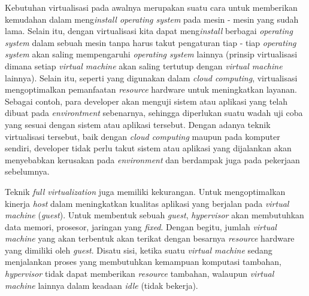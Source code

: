 Kebutuhan virtualisasi pada awalnya merupakan suatu cara untuk memberikan kemudahan dalam meng\textit{install operating system} pada mesin - mesin yang sudah lama. Selain itu, dengan virtualisasi kita dapat meng\textit{install} berbagai \textit{operating system} dalam sebuah mesin tanpa harus takut pengaturan tiap - tiap \textit{operating system} akan saling mempengaruhi \textit{operating system} lainnya (prinsip virtualisasi dimana setiap \textit{virtual machine} akan saling tertutup dengan \textit{virtual machine} lainnya). Selain itu, seperti yang digunakan dalam \textit{cloud computing}, virtualisasi mengoptimalkan pemanfaatan \textit{resource} hardware untuk meningkatkan layanan. Sebagai contoh, para developer akan menguji sistem atau aplikasi yang telah dibuat pada \textit{environtment} sebenarnya, sehingga diperlukan suatu wadah uji coba yang sesuai dengan sistem atau aplikasi tersebut. Dengan adanya teknik virtualisasi tersebut, baik dengan \textit{cloud computing} maupun pada komputer sendiri, developer tidak perlu takut sistem atau aplikasi yang dijalankan akan menyebabkan kerusakan pada \textit{environment} dan berdampak juga pada pekerjaan sebelumnya.

Teknik \textit{full virtualization} juga memiliki kekurangan. Untuk mengoptimalkan kinerja \textit{host} dalam meningkatkan kualitas aplikasi yang berjalan pada \textit{virtual machine} (\textit{guest}). Untuk membentuk sebuah \textit{guest}, \textit{hypervisor} akan membutuhkan data memori, prosesor, jaringan yang \textit{fixed}. Dengan begitu, jumlah \textit{virtual machine} yang akan terbentuk akan terikat dengan besarnya \textit{resource} hardware yang dimiliki oleh \textit{guest}. Disatu sisi, ketika suatu \textit{virtual machine} sedang menjalankan proses yang membutuhkan kemampuan komputasi tambahan, \textit{hypervisor} tidak dapat memberikan \textit{resource} tambahan, walaupun \textit{virtual machine} lainnya dalam keadaan \textit{idle} (tidak bekerja). 

      

